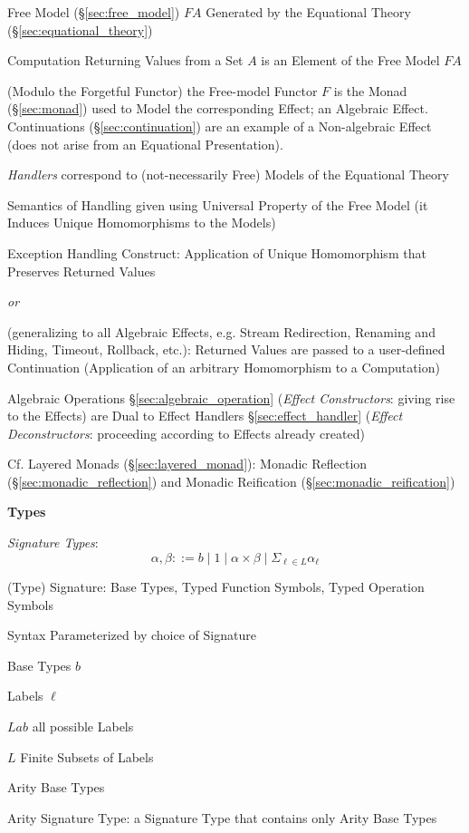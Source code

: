 Free Model (\S\ref{sec:free_model}) $F A$ Generated by the Equational
Theory (\S\ref{sec:equational_theory})

Computation Returning Values from a Set $A$ is an Element of the Free
Model $F A$

(Modulo the Forgetful Functor) the Free-model Functor $F$ is the Monad
(\S\ref{sec:monad}) used to Model the corresponding Effect; an
Algebraic Effect. Continuations (\S\ref{sec:continuation}) are an
example of a Non-algebraic Effect (does not arise from an Equational
Presentation).

\emph{Handlers} correspond to (not-necessarily Free) Models of the
Equational Theory

Semantics of Handling given using Universal Property of the Free Model
(it Induces Unique Homomorphisms to the Models)

Exception Handling Construct: Application of Unique Homomorphism that
Preserves Returned Values

\emph{or}

(generalizing to all Algebraic Effects, e.g. Stream Redirection,
Renaming and Hiding, Timeout, Rollback, etc.): Returned Values are
passed to a user-defined Continuation (Application of an arbitrary
Homomorphism to a Computation)

Algebraic Operations \S\ref{sec:algebraic_operation} (\emph{Effect
  Constructors}: giving rise to the Effects) are Dual to Effect
Handlers \S\ref{sec:effect_handler} (\emph{Effect Deconstructors}:
proceeding according to Effects already created)

\fist Cf. Layered Monads (\S\ref{sec:layered_monad}): Monadic
Reflection (\S\ref{sec:monadic_reflection}) and Monadic Reification
(\S\ref{sec:monadic_reification})


\textbf{Types}

\emph{Signature Types}:
\[
  \alpha, \beta ::= b \;|\; 1 \;|\; \alpha \times \beta \;|\;
    \Sigma_{\ell \in L} \alpha_\ell
\]

(Type) Signature: Base Types, Typed Function Symbols, Typed Operation
Symbols

Syntax Parameterized by choice of Signature

Base Types $b$

Labels $\ell$

$Lab$ all possible Labels

$L$ Finite Subsets of Labels

Arity Base Types

Arity Signature Type: a Signature Type that contains only Arity Base
Types

